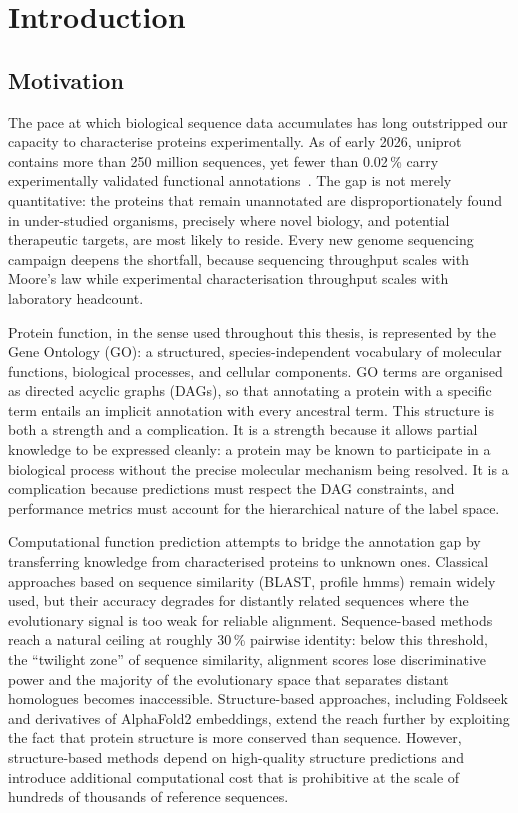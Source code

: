 \chapter{Introduction}
\label{chap:introduction}

\section{Motivation}
\label{sec:motivation}

The pace at which biological sequence data accumulates has long outstripped our
capacity to characterise proteins experimentally. As of early 2026, \gls{uniprot}
contains more than 250 million sequences, yet fewer than 0.02\,\% carry
experimentally validated functional annotations~\cite{uniprot2023}. The gap is not
merely quantitative: the proteins that remain unannotated are disproportionately
found in under-studied organisms, precisely where novel biology, and potential
therapeutic targets, are most likely to reside. Every new genome sequencing campaign
deepens the shortfall, because sequencing throughput scales with Moore's law while
experimental characterisation throughput scales with laboratory headcount.

Protein function, in the sense used throughout this thesis, is represented by the
Gene Ontology (GO): a structured, species-independent vocabulary of molecular
functions, biological processes, and cellular components. GO terms are organised as
directed acyclic graphs (DAGs), so that annotating a protein with a specific term
entails an implicit annotation with every ancestral term. This structure is both a
strength and a complication. It is a strength because it allows partial knowledge to
be expressed cleanly: a protein may be known to participate in a biological process
without the precise molecular mechanism being resolved. It is a complication because
predictions must respect the DAG constraints, and performance metrics must account
for the hierarchical nature of the label space.

Computational function prediction attempts to bridge the annotation gap by transferring
knowledge from characterised proteins to unknown ones. Classical approaches based on
sequence similarity (BLAST, profile \glspl{hmm}) remain widely used, but their
accuracy degrades for distantly related sequences where the evolutionary signal is
too weak for reliable alignment. Sequence-based methods reach a natural ceiling at
roughly 30\,\% pairwise identity: below this threshold, the ``twilight zone'' of
sequence similarity, alignment scores lose discriminative power and the majority of
the evolutionary space that separates distant homologues becomes inaccessible.
Structure-based approaches, including Foldseek and derivatives of AlphaFold2
embeddings, extend the reach further by exploiting the fact that protein structure is
more conserved than sequence. However, structure-based methods depend on high-quality
structure predictions and introduce additional computational cost that is prohibitive
at the scale of hundreds of thousands of reference sequences.

